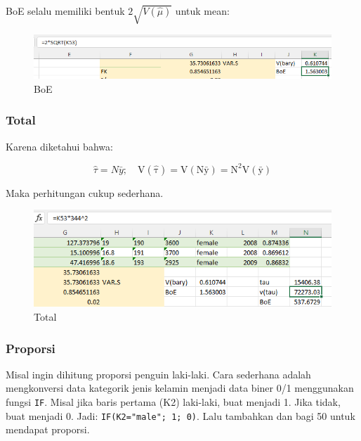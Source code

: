 \documentclass[
  letterpaper,
  DIV=11,
  numbers=noendperiod]{scrreprt}
\begin{document}
BoE selalu memiliki bentuk \(2\sqrt{V(\hat{\mu})}\) untuk mean:

\begin{figure}

{\centering \includegraphics{./count-8.png}

}

\caption{BoE}

\end{figure}

\hypertarget{total-1}{%
\subsubsection{Total}\label{total-1}}

Karena diketahui bahwa:

\[
\hat{\tau}=N\bar{y};\quad \mathrm{V(\hat{\tau})}= \mathrm{V(N\bar{y})=N^2V(\bar{y})}
\]

Maka perhitungan cukup sederhana.

\begin{figure}

{\centering \includegraphics{./count-9.png}

}

\caption{Total}

\end{figure}

\hypertarget{proporsi-1}{%
\subsubsection{Proporsi}\label{proporsi-1}}

Misal ingin dihitung proporsi penguin laki-laki. Cara sederhana adalah
mengkonversi data kategorik jenis kelamin menjadi data biner 0/1
menggunakan fungsi \texttt{IF}. Misal jika baris pertama (K2) laki-laki,
buat menjadi 1. Jika tidak, buat menjadi 0. Jadi:
\texttt{IF(K2="male";\ 1;\ 0)}. Lalu tambahkan dan bagi 50 untuk
mendapat proporsi.
\end{document}
